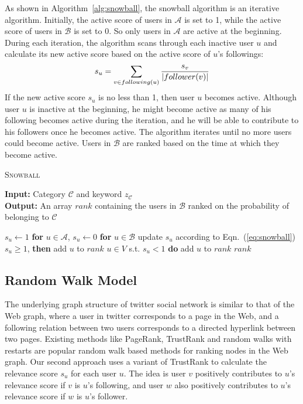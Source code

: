 \documentclass{article}
\begin{document}
As shown in Algorithm~\ref{alg:snowball}, the snowball algorithm is an iterative algorithm. Initially, the active score of users in $\mathcal{A}$ is set to 1, while the active score of users in $\mathcal{B}$ is set to 0. So only users in $\mathcal{A}$ are active at the beginning. During each iteration, the algorithm scans through each inactive user $u$ and calculate its new active score based on the active score of $u$'s followings:
\begin{equation}\label{eq:snowball}
s_u = \sum_{v \in following(u)} \frac{s_v}{|follower(v)|}
\end{equation}
If the new active score $s_u$ is no less than 1, then user $u$ becomes active. Although user $u$ is inactive at the beginning, he might become active as many of his following becomes active during the iteration, and he will be able to contribute to his followers once he becomes active. The algorithm iterates until no more users could become active. Users in $\mathcal{B}$ are ranked based on the time at which they become active.

\begin{algorithm}[htbp]
\caption{\textsc{Snowball}}
\textbf{Input: }{Category $\mathcal{C}$ and keyword $z_{\mathcal{C}}$}\\
\textbf{Output: }{An array $rank$ containing the users in $\mathcal{B}$ ranked on the probability of belonging to $\mathcal{C}$}
\begin{algorithmic}[1]
\STATE $s_u \leftarrow 1$ {\bf for} $u \in \mathcal{A}$, $s_u \leftarrow 0$ {\bf for} $u \in \mathcal{B}$
    \STATE update $s_u$ according to Eqn.~(\ref{eq:snowball})
     $s_u \geq 1$, {\bf then} add $u$ to $rank$
\ENDFOR
\ENDWHILE
{} $u \in V$ s.t. $s_u < 1$ {\bf do} add $u$ to $rank$
\RETURN $rank$
\end{algorithmic}
\label{alg:snowball}
\end{algorithm}

\subsection{Random Walk Model}

The underlying graph structure of twitter social network is similar to that of the Web graph, where a user in twitter corresponds to a page in the Web, and a following relation between two users corresponds to a directed hyperlink between two pages. Existing methods like PageRank\cite{page1999pagerank}, TrustRank\cite{gyngyi2004combating} and random walks with restarts\cite{tong2006fast} are popular random walk based methods for ranking nodes in the Web graph. Our second approach uses a variant of TrustRank to calculate the relevance score $s_u$ for each user $u$. The idea is user $v$ positively contributes to $u$'s relevance score if $v$ is $u$'s following, and user $w$ also positively contributes to $u$'s relevance score if $w$ is $u$'s follower.
\end{document}
